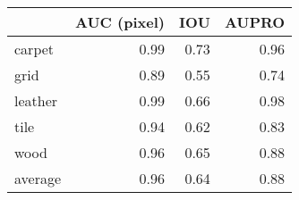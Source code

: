 \begin{tabular}{lrrr}
\toprule
{} &  AUC (pixel) &  IOU &  AUPRO \\
\midrule
carpet  &         0.99 & 0.73 &   0.96 \\
grid    &         0.89 & 0.55 &   0.74 \\
leather &         0.99 & 0.66 &   0.98 \\
tile    &         0.94 & 0.62 &   0.83 \\
wood    &         0.96 & 0.65 &   0.88 \\
average &         0.96 & 0.64 &   0.88 \\
\bottomrule
\end{tabular}
